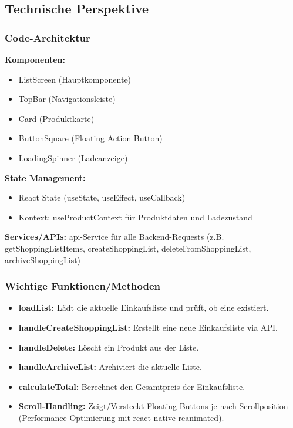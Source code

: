 \documentclass[12pt, a4paper]{report} %
\begin{document}
\subsection{Technische Perspektive}

\subsubsection{Code-Architektur}

\textbf{Komponenten:}
\begin{itemize}
    \item ListScreen (Hauptkomponente)
    \item TopBar (Navigationsleiste)
    \item Card (Produktkarte)
    \item ButtonSquare (Floating Action Button)
    \item LoadingSpinner (Ladeanzeige)
\end{itemize}

\noindent\textbf{State Management:}
\begin{itemize}
    \item React State (useState, useEffect, useCallback)
    \item Kontext: useProductContext für Produktdaten und Ladezustand
\end{itemize}

\noindent\textbf{Services/APIs:}
api-Service für alle Backend-Requests (z.B. getShoppingListItems, createShoppingList, deleteFromShoppingList, archiveShoppingList)

\subsubsection{Wichtige Funktionen/Methoden}
\begin{itemize}
    \item \textbf{loadList:} Lädt die aktuelle Einkaufsliste und prüft, ob eine existiert.
    \item \textbf{handleCreateShoppingList:} Erstellt eine neue Einkaufsliste via API.
    \item \textbf{handleDelete:} Löscht ein Produkt aus der Liste.
    \item \textbf{handleArchiveList:} Archiviert die aktuelle Liste.
    \item \textbf{calculateTotal:} Berechnet den Gesamtpreis der Einkaufsliste.
    \item \textbf{Scroll-Handling:} Zeigt/Versteckt Floating Buttons je nach Scrollposition (Performance-Optimierung mit react-native-reanimated).
\end{itemize}
\end{document}
